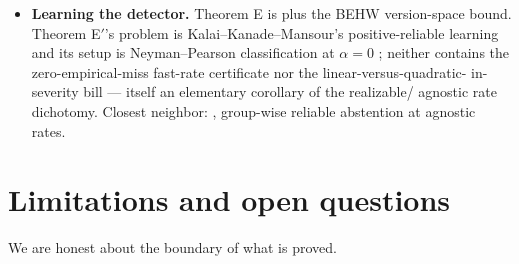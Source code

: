 \documentclass[11pt]{article}
\theoremstyle{plain}
\theoremstyle{definition}
\begin{document}
\begin{itemize}
  testing with abstention at asymptotic exponents over unrestricted
  detectors.
\item \textbf{Learning the detector.} Theorem E is \citet{vapnik1971} plus the
  BEHW \citeyearpar{blumer1989} version-space bound. Theorem E$'$'s problem is Kalai--Kanade--Mansour's
  positive-reliable learning \citep{kalai2012} and its setup is Neyman--Pearson
  classification at $\alpha = 0$ \citep{scottnowak2005}; neither contains the
  zero-empirical-miss fast-rate certificate nor the linear-versus-quadratic-
  in-severity bill --- itself an elementary corollary of the realizable/
  agnostic rate dichotomy. Closest neighbor: \citet{casacuberta2025},
  group-wise reliable abstention at agnostic rates.
\end{itemize}

\section{Limitations and open questions}\label{sec:limitations}

We are honest about the boundary of what is proved.
\end{document}
